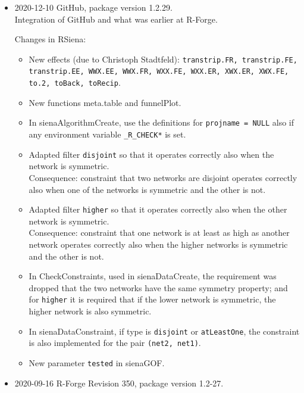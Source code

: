 \documentclass[a4paper,fleqn,11pt]{article}
\newcommand{\+}{\, + \,}
\newcommand{\sfn}[1]{\textsf{#1}}
\begin{document}
\begin{small}
\begin{itemize}
\item 2020-12-10  GitHub, package version 1.2.29.\\
Integration of GitHub and what was earlier at R-Forge.

Changes in RSiena:
\begin{itemize}
   \item New effects (due to Christoph Stadtfeld):
     \texttt{transtrip.FR, transtrip.FE, transtrip.EE, WWX.EE, WWX.FR, WXX.FE,
     WXX.ER, XWX.ER, XWX.FE, to.2, toBack, toRecip}.
   \item New functions \sfn{meta.table} and \sfn{funnelPlot}.
   \item In \textsf{sienaAlgorithmCreate}, use the definitions for \texttt{projname = NULL}
     also if any environment variable \texttt{\_R\_CHECK*} is set.
   \item Adapted filter \texttt{disjoint} so that it operates correctly
     also when the network is symmetric.\\
     Consequence: constraint that two networks are disjoint
     operates correctly also when one of the networks is symmetric
     and the other is not.
   \item Adapted filter \texttt{higher} so that it operates correctly
     also when the other network is symmetric.\\
     Consequence: constraint that one network is at least as high
     as another network operates correctly also when
     the higher networks is symmetric and the other is not.
   \item In \sfn{CheckConstraints}, used in \textsf{sienaDataCreate}, the requirement
     was dropped that the two networks have the same symmetry property;
     and for \texttt{higher} it is required that if the lower network
     is symmetric, the higher network is also symmetric.
   \item In \sfn{sienaDataConstraint}, if type is \texttt{disjoint} or \texttt{atLeastOne},
     the constraint is also implemented for the pair \texttt{(net2, net1)}.
   \item New parameter \texttt{tested} in \textsf{sienaGOF}.
\end{itemize}

\item 2020-09-16 R-Forge Revision 350, package version 1.2-27.


\end{itemize}
\end{small}
\end{document}
